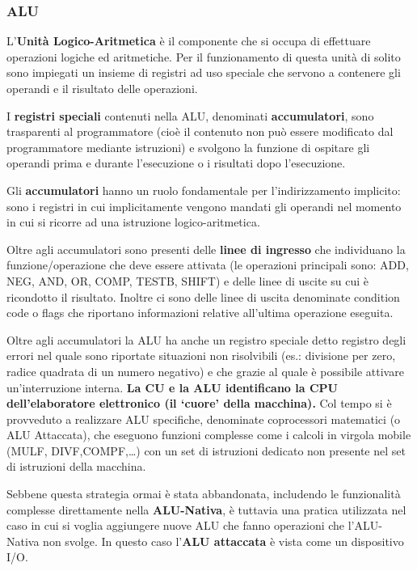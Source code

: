 \documentclass[12pt]{article} %
\begin{document}
\subsubsection{ALU}
L’\textbf{Unità Logico-Aritmetica} è il componente che si occupa di effettuare operazioni logiche ed aritmetiche. Per il funzionamento di questa unità di solito sono impiegati un insieme di registri ad uso speciale che servono a contenere gli operandi e il risultato delle operazioni. \par\medskip\noindent
I \textbf{registri speciali} contenuti nella ALU, denominati \textbf{accumulatori}, sono trasparenti al programmatore (cioè il contenuto non può essere modificato dal programmatore mediante istruzioni) e svolgono la funzione di ospitare gli operandi prima e durante l’esecuzione o i risultati dopo l’esecuzione.\par\medskip\noindent
Gli \textbf{accumulatori} hanno un ruolo fondamentale per l’indirizzamento implicito: sono i registri in cui implicitamente vengono mandati gli operandi nel momento in cui si ricorre ad una istruzione logico-aritmetica.\par\medskip\noindent
Oltre agli accumulatori sono presenti delle \textbf{linee di ingresso} che individuano la funzione/operazione che deve essere attivata (le operazioni principali sono: ADD, NEG,
AND, OR, COMP, TESTB, SHIFT) e delle linee di uscite su cui è ricondotto il risultato. Inoltre ci sono delle linee di uscita denominate condition code o flags che riportano informazioni relative all’ultima operazione eseguita. \par\medskip\noindent
Oltre agli accumulatori la ALU ha anche un registro speciale detto registro degli errori nel quale sono riportate situazioni non risolvibili (es.: divisione per zero, radice quadrata di un numero negativo) e che grazie al quale è possibile attivare un’interruzione interna.
\textbf{La CU e la ALU identificano la CPU dell’elaboratore elettronico (il ‘cuore’ della macchina).} Col tempo si è provveduto a realizzare ALU specifiche, denominate coprocessori matematici (o ALU Attaccata), che eseguono funzioni complesse come i calcoli in virgola mobile (MULF, DIVF,COMPF,…) con un set di istruzioni dedicato non presente nel set di istruzioni della macchina. \par\medskip\noindent
Sebbene questa strategia ormai è stata abbandonata, includendo le funzionalità complesse direttamente nella \textbf{ALU-Nativa}, è tuttavia una pratica utilizzata nel caso in cui si voglia aggiungere nuove ALU che fanno operazioni che l’ALU-Nativa non svolge. In questo caso l’\textbf{ALU attaccata} è vista come un dispositivo I/O.\par\medskip\noindent
\end{document}
